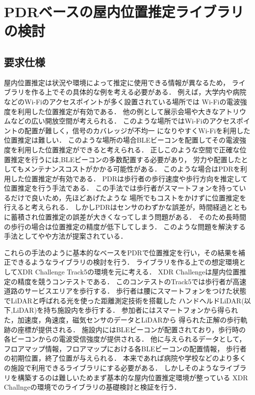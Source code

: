 \documentclass[Japanese]{dicomopapers}
\begin{document}
\section{PDRベースの屋内位置推定ライブラリの検討}

\subsection{要求仕様}

屋内位置推定は状況や環境によって推定に使用できる情報が異なるため，
ライブラリを作る上でその具体的な例を考える必要がある．
例えば，大学内や病院などのWi-Fiのアクセスポイントが多く設置されている場所では
Wi-Fiの電波強度を利用した位置推定が有効である．
他の例として展示会場や大きなアトリウムなどの広い開放空間が考えられる．
このような場所ではWi-Fiのアクセスポイントの配置が難しく，信号のカバレッジが不均一
になりやすくWi-Fiを利用した位置推定は難しい．
このような場所の場合BLEビーコンを配置してその電波強度を利用した位置推定ができると考えられる．
正しこのような空間で正確な位置推定を行うには,BLEビーコンの多数配置する必要があり，
労力や配置したとしてもメンテナンスコストがかかる可能性がある．
このような場合はPDRを利用した位置推定が有効である．
PDRは歩行者の歩行速度や歩行方向を推定して位置推定を行う手法である．
この手法では歩行者がスマートフォンを持っているだけで良いため，先ほどあげたような
場所でもコストをかけずに位置推定を行えると考えられる．
しかしPDRはセンサのわずかな誤差が，時間経過とともに蓄積され位置推定の誤差が大きくなってしまう問題がある．
そのため長時間の歩行の場合は位置推定の精度が低下してしまう．
このような問題を解決する手法として\cite{pdr-wifi}や\cite{pdr-ble}や方法が提案されている．

これらの手法のように基本的なベースをPDRで位置推定を行い，その結果を補正できるようなライブラリの検討を行う．
ライブラリを作る上での想定環境としてXDR Challenge Track5の環境を元に考える．
XDR Challengeは屋内位置推定の精度を競うコンテストである．
このコンテストのTrack5では歩行者が高速道路のサービスエリアを歩行する．
歩行者は腰にスマートフォンをつけた状態でLiDARと呼ばれる光を使った距離測定技術を搭載した
ハンドヘルドLiDAR(以下,LiDAR)を持ち施設内を歩行する．
参加者にはスマートフォンから得られた，加速度，角速度，磁気センサのデータとLiDARから
得られた正解の歩行軌跡の座標が提供される．
施設内にはBLEビーコンが配置されており，歩行時の各ビーコンからの電波受信強度が提供される．
他に与えられるデータとして，フロアマップ情報，フロアマップにおける各BLEビーコンの配置情報，
歩行者の初期位置，終了位置が与えられる．
本来であれば病院や学校などのより多くの施設で利用できるライブラリにする必要がある．
しかしそのようなライブラリを構築するのは難しいためまず基本的な屋内位置推定環境が整っている
XDR Challngeの環境でのライブラリの基礎検討と検証を行う．
\end{document}
